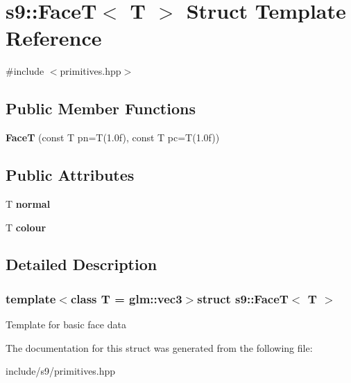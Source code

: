 \hypertarget{structs9_1_1FaceT}{\section{s9\-:\-:\-Face\-T$<$ \-T $>$ \-Struct \-Template \-Reference}
\label{structs9_1_1FaceT}
}


{\ttfamily \#include $<$primitives.\-hpp$>$}

\subsection*{\-Public \-Member \-Functions}
\begin{DoxyCompactItemize}
\item 
\hypertarget{structs9_1_1FaceT_aea08fe5c720cb7583848e6b607e08578}{{\bfseries \-Face\-T} (const \-T pn=\-T(1.\-0f), const T pc=\-T(1.\-0f))}\label{structs9_1_1FaceT_aea08fe5c720cb7583848e6b607e08578}

\end{DoxyCompactItemize}
\subsection*{\-Public \-Attributes}
\begin{DoxyCompactItemize}
\item 
\hypertarget{structs9_1_1FaceT_a7d09b990558cead182390f8682bccced}{\-T {\bfseries normal}}\label{structs9_1_1FaceT_a7d09b990558cead182390f8682bccced}

\item 
\hypertarget{structs9_1_1FaceT_aefc4be377e283e8e51400853d5ab193d}{\-T {\bfseries colour}}\label{structs9_1_1FaceT_aefc4be377e283e8e51400853d5ab193d}

\end{DoxyCompactItemize}


\subsection{\-Detailed \-Description}
\subsubsection*{template$<$class T = glm\-::vec3$>$struct s9\-::\-Face\-T$<$ T $>$}

\-Template for basic face data 

\-The documentation for this struct was generated from the following file\-:\begin{DoxyCompactItemize}
\item 
include/s9/primitives.\-hpp\end{DoxyCompactItemize}
